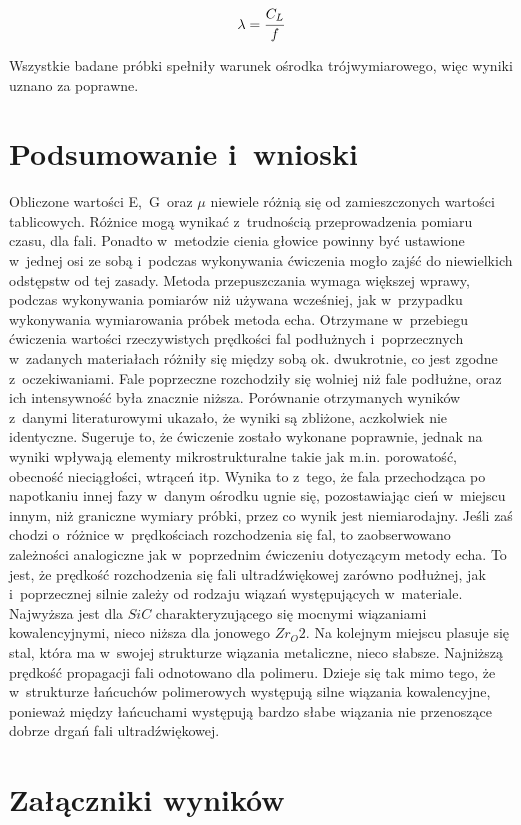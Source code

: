 \documentclass[a4paper,12pt]{article}
\begin{document}
$$\lambda=\cfrac{C_L}{f}$$



Wszystkie badane próbki spełniły warunek ośrodka trójwymiarowego, więc wyniki uznano za poprawne.
\newpage

\section{Podsumowanie i~wnioski}
Obliczone wartości E,~G~oraz $\mu$ niewiele różnią się od zamieszczonych wartości tablicowych. Różnice mogą wynikać z~trudnością przeprowadzenia  pomiaru czasu, dla fali. Ponadto w~metodzie cienia głowice powinny być ustawione w~jednej osi ze sobą i~podczas wykonywania ćwiczenia mogło zajść do niewielkich odstępstw od tej zasady. Metoda przepuszczania wymaga większej wprawy, podczas wykonywania pomiarów niż używana wcześniej, jak w~przypadku wykonywania wymiarowania próbek metoda echa.
Otrzymane w~przebiegu ćwiczenia wartości rzeczywistych prędkości fal podłużnych i~poprzecznych w~zadanych materiałach różniły się między sobą ok. dwukrotnie, co jest zgodne z~oczekiwaniami. Fale poprzeczne rozchodziły się wolniej niż fale podłużne, oraz ich intensywność była znacznie niższa. 
Porównanie otrzymanych wyników z~danymi literaturowymi ukazało, że wyniki są zbliżone, aczkolwiek nie identyczne. Sugeruje to, że ćwiczenie zostało wykonane poprawnie, jednak na wyniki wpływają elementy mikrostrukturalne takie jak m.in. porowatość, obecność nieciągłości, wtrąceń itp. Wynika to z~tego, że fala przechodząca po napotkaniu innej fazy w~danym ośrodku ugnie się, pozostawiając cień w~miejscu innym, niż graniczne wymiary próbki, przez co wynik jest niemiarodajny. 
Jeśli zaś chodzi o~różnice w~prędkościach rozchodzenia się fal, to zaobserwowano zależności analogiczne jak w~poprzednim ćwiczeniu dotyczącym metody echa. To jest, że prędkość rozchodzenia się fali ultradźwiękowej zarówno podłużnej, jak i~poprzecznej silnie zależy od rodzaju wiązań występujących w~materiale. Najwyższa jest dla $SiC$ charakteryzującego się mocnymi wiązaniami kowalencyjnymi, nieco niższa dla jonowego  $Zr_O2$. Na kolejnym miejscu plasuje się stal, która ma w~swojej strukturze wiązania metaliczne, nieco słabsze. Najniższą prędkość propagacji fali odnotowano dla polimeru. Dzieje się tak mimo tego, że w~strukturze łańcuchów polimerowych występują silne wiązania kowalencyjne, ponieważ między łańcuchami występują bardzo słabe wiązania nie przenoszące dobrze drgań fali ultradźwiękowej.

\section{Załączniki wyników}
\end{document}
